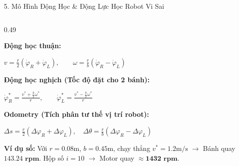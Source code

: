 \documentclass[aspectratio=169,9pt]{beamer}
\newcommand{\tinytext}[1]{{\fontsize{6.3}{7.3}\selectfont #1\par}}
\newcommand{\heading}[1]{{\bfseries\color{PTITRed} #1\par}}
\begin{document}
\begin{frame}{5. Mô Hình Động Học \& Động Lực Học Robot Vi Sai}
  \vspace{0.02cm}
  \begin{columns}[T,onlytextwidth]
    \begin{column}{0.49\textwidth}
      \begin{tcolorbox}[titlepanel,title=Động học hai bánh vi sai (Kinematics)]
        \heading{Động học thuận:}
        \vspace{-0.08cm}
        {\fontsize{7.8}{9.0}\selectfont
        \(\displaystyle v = \frac{r}{2}(\dot{\varphi}_R + \dot{\varphi}_L), \qquad \omega = \frac{r}{b}(\dot{\varphi}_R - \dot{\varphi}_L)\)\par}
        \vspace{0.04cm}
        \heading{Động học nghịch (Tốc độ đặt cho 2 bánh):}
        \vspace{-0.08cm}
        {\fontsize{7.8}{9.0}\selectfont
        \(\displaystyle \dot{\varphi}_R^* = \frac{v^* + \frac{b}{2}\omega^*}{r}, \qquad \dot{\varphi}_L^* = \frac{v^* - \frac{b}{2}\omega^*}{r}\)\par}
        \vspace{0.04cm}
        \heading{Odometry (Tích phân tư thế vị trí robot):}
        \vspace{-0.08cm}
        {\fontsize{7.8}{9.0}\selectfont
        \(\displaystyle \Delta s = \frac{r}{2}(\Delta\varphi_R + \Delta\varphi_L), \quad \Delta\theta = \frac{r}{b}(\Delta\varphi_R - \Delta\varphi_L)\)\par}
        \vspace{0.06cm}
        \begin{tcolorbox}[keypanel]
          \tinytext{\textbf{Ví dụ số:} Với $r=0.08\text{m}$, $b=0.45\text{m}$, chạy thẳng $v^*=1.2\text{m/s}$ $\rightarrow$ Bánh quay $\mathbf{143.24\text{ rpm}}$. Hộp số $i=10$ $\rightarrow$ Motor quay $\approx \mathbf{1432\text{ rpm}}$.}
        \end{tcolorbox}
      \end{tcolorbox}
    \end{column}


\end{columns}
\end{frame}
\end{document}
